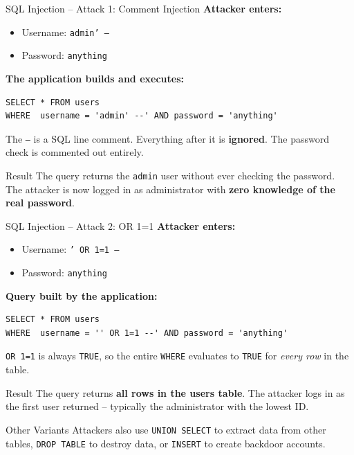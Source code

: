 \begin{frame}[fragile]{SQL Injection -- Attack 1: Comment Injection}
  \textbf{Attacker enters:}
  \begin{itemize}
    \item Username: \texttt{admin' --}
    \item Password: \texttt{anything}
  \end{itemize}

  \medskip
  \textbf{The application builds and executes:}
  \begin{lstlisting}[style=sqlstyle]
SELECT * FROM users
WHERE  username = 'admin' --' AND password = 'anything'
  \end{lstlisting}

  The \texttt{--} is a SQL line comment. Everything after it is \textbf{ignored}.
  The password check is commented out entirely.

  \begin{alertblock}{Result}
    The query returns the \texttt{admin} user without ever checking the password.
    The attacker is now logged in as administrator with \textbf{zero knowledge of the real password}.
  \end{alertblock}
\end{frame}

\begin{frame}[fragile]{SQL Injection -- Attack 2: OR 1=1}
  \textbf{Attacker enters:}
  \begin{itemize}
    \item Username: \texttt{' OR 1=1 --}
    \item Password: \texttt{anything}
  \end{itemize}

  \textbf{Query built by the application:}
  \begin{lstlisting}[style=sqlstyle]
SELECT * FROM users
WHERE  username = '' OR 1=1 --' AND password = 'anything'
  \end{lstlisting}

  \texttt{OR 1=1} is always \texttt{TRUE}, so the entire \texttt{WHERE} evaluates to \texttt{TRUE}
  for \emph{every row} in the table.

  \begin{alertblock}{Result}
    The query returns \textbf{all rows in the users table}. The attacker logs in as the first
    user returned -- typically the administrator with the lowest ID.
  \end{alertblock}

  \begin{block}{Other Variants}
    Attackers also use \texttt{UNION SELECT} to extract data from other tables, \texttt{DROP TABLE}
    to destroy data, or \texttt{INSERT} to create backdoor accounts.
  \end{block}
\end{frame}

